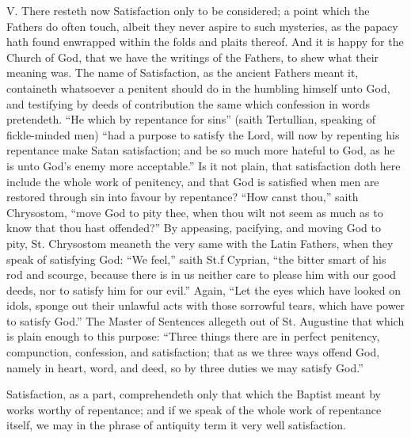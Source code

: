 V. There resteth now Satisfaction only to be considered; a point which the Fathers do often touch, albeit they never aspire to such mysteries, as the papacy hath found enwrapped within the folds and plaits thereof. And it is happy for the Church of God, that we have the writings of the Fathers, to shew what their meaning was. The name of Satisfaction, as the ancient Fathers meant it, containeth whatsoever a penitent should do in the humbling himself unto God, and testifying by deeds of contribution the same which confession in words pretendeth. “He which by repentance for sins” (saith Tertullian, speaking of fickle-minded men) “had a purpose to satisfy the Lord, will now by repenting his repentance make Satan satisfaction; and be so much more hateful to God, as he is unto God’s enemy more acceptable.” Is it not plain, that satisfaction doth here include the whole work of penitency, and that God is satisfied when men are restored through sin into favour by repentance? “How canst thou,” saith Chrysostom, “move God to pity thee, when thou wilt not seem as much as to know that thou hast offended?” By appeasing, pacifying, and moving God to pity, St. Chrysostom meaneth the very same with the Latin Fathers, when they speak of satisfying God: “We feel,” saith St.f Cyprian,  “the bitter smart of his rod and scourge, because there is in us neither care to please him with our good deeds, nor to satisfy him for our evil.” Again, “Let the eyes which have looked on idols, sponge out their unlawful acts with those sorrowful tears, which have power to satisfy God.” The Master of Sentences allegeth out of St. Augustine that which is plain enough to this purpose: “Three things there are in perfect penitency, compunction, confession, and satisfaction; that as we three ways offend God, namely in heart, word, and deed, so by three duties we may satisfy God.”

Satisfaction, as a part, comprehendeth only that which the Baptist meant by works worthy of repentance; and if we speak of the whole work of repentance itself, we may in the phrase of antiquity term it very well satisfaction.

